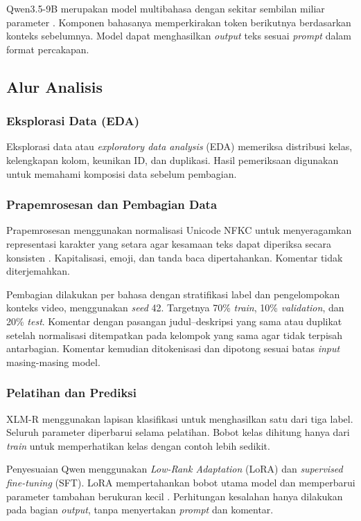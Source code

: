 \documentclass[11pt]{article}
\begin{document}
Qwen3.5-9B merupakan model multibahasa dengan sekitar sembilan miliar parameter \citep{qwen-team-2026-qwen35}. Komponen bahasanya memperkirakan token berikutnya berdasarkan konteks sebelumnya. Model dapat menghasilkan \textit{output} teks sesuai \textit{prompt} dalam format percakapan.

\subsection{Alur Analisis}
\subsubsection{Eksplorasi Data (EDA)}
Eksplorasi data atau \textit{exploratory data analysis} (EDA) memeriksa distribusi kelas, kelengkapan kolom, keunikan ID, dan duplikasi. Hasil pemeriksaan digunakan untuk memahami komposisi data sebelum pembagian.

\subsubsection{Prapemrosesan dan Pembagian Data}
Prapemrosesan menggunakan normalisasi Unicode NFKC untuk menyeragamkan representasi karakter yang setara agar kesamaan teks dapat diperiksa secara konsisten \citep{unicode-consortium-2026-normalization}. Kapitalisasi, emoji, dan tanda baca dipertahankan. Komentar tidak diterjemahkan.

Pembagian dilakukan per bahasa dengan stratifikasi label dan pengelompokan konteks video, menggunakan \textit{seed} 42. Targetnya 70\% \textit{train}, 10\% \textit{validation}, dan 20\% \textit{test}. Komentar dengan pasangan judul--deskripsi yang sama atau duplikat setelah normalisasi ditempatkan pada kelompok yang sama agar tidak terpisah antarbagian. Komentar kemudian ditokenisasi dan dipotong sesuai batas \textit{input} masing-masing model.

\subsubsection{Pelatihan dan Prediksi}
XLM-R menggunakan lapisan klasifikasi untuk menghasilkan satu dari tiga label. Seluruh parameter diperbarui selama pelatihan. Bobot kelas dihitung hanya dari \textit{train} untuk memperhatikan kelas dengan contoh lebih sedikit.

Penyesuaian Qwen menggunakan \textit{Low-Rank Adaptation} (LoRA) dan \textit{supervised fine-tuning} (SFT). LoRA mempertahankan bobot utama model dan memperbarui parameter tambahan berukuran kecil \citep{hu-etal-2021-lora}. Perhitungan kesalahan hanya dilakukan pada bagian \textit{output}, tanpa menyertakan \textit{prompt} dan komentar.
\end{document}
